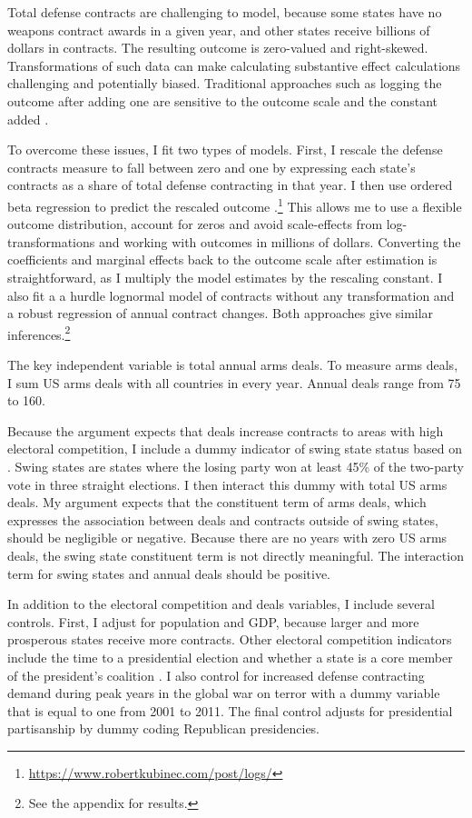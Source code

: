 \documentclass[12pt]{article}
\begin{document}
Total defense contracts are challenging to model, because some states have no weapons contract awards in a given year, and other states receive billions of dollars in contracts. 
The resulting outcome is zero-valued and right-skewed. 
Transformations of such data can make calculating substantive effect calculations challenging and potentially biased. 
Traditional approaches such as logging the outcome after adding one are sensitive to the outcome scale and the constant added \citep{ChenRoth2022, MullahyNorton2022}. 


To overcome these issues, I fit two types of models.
First, I rescale the defense contracts measure to fall between zero and one by expressing each state's contracts as a share of total defense contracting in that year.
I then use ordered beta regression to predict the rescaled outcome \citep{Kubinec2022}.\footnote{\url{https://www.robertkubinec.com/post/logs/}} 
This allows me to use a flexible outcome distribution, account for zeros and avoid scale-effects from log-transformations and working with outcomes in millions of dollars. 
Converting the coefficients and marginal effects back to the outcome scale after estimation is straightforward, as I multiply the model estimates by the rescaling constant.
I also fit a a hurdle lognormal model of contracts without any transformation and a robust regression of annual contract changes. 
Both approaches give similar inferences.\footnote{See the appendix for results.} 


The key independent variable is total annual arms deals.  
To measure arms deals, I sum US arms deals with all countries in every year. 
Annual deals range from 75 to 160. 


Because the argument expects that deals increase contracts to areas with high electoral competition, I include a dummy indicator of swing state status based on \citet{KrinerReeves2015}.
Swing states are states where the losing party won at least 45\% of the two-party vote in three straight elections. 
I then interact this dummy with total US arms deals. 
My argument expects that the constituent term of arms deals, which expresses the association between deals and contracts outside of swing states, should be negligible or negative.
Because there are no years with zero US arms deals, the swing state constituent term is not directly meaningful.  
The interaction term for swing states and annual deals should be positive.


In addition to the electoral competition and deals variables, I include several controls. 
First, I adjust for population and GDP, because larger and more prosperous states receive more contracts. 
Other electoral competition indicators include the time to a presidential election and whether a state is a core member of the president's coalition \citep{KrinerReeves2015}. 
I also control for increased defense contracting demand during peak years in the global war on terror with a dummy variable that is equal to one from 2001 to 2011. 
The final control adjusts for presidential partisanship by dummy coding Republican presidencies. 
\end{document}
